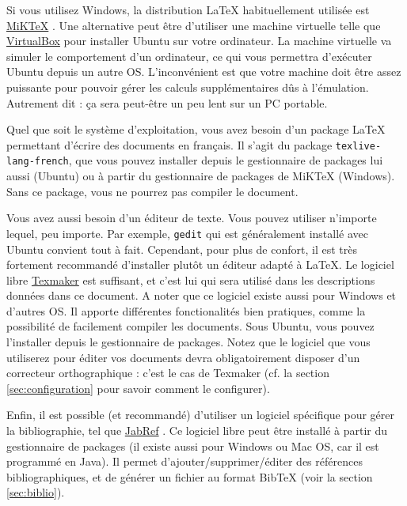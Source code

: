 \documentclass{ceri}
\begin{document}
Si vous utilisez Windows, la distribution \LaTeX{} habituellement utilisée est \href{http://miktex.org/}{MiKTeX} \cite{MiKTeX2015}. Une alternative peut être d'utiliser une machine virtuelle telle que \href{http://www.virtualbox.org/}{VirtualBox} \cite{Oracle2011} pour installer Ubuntu sur votre ordinateur. La machine virtuelle va simuler le comportement d'un ordinateur, ce qui vous permettra d'exécuter Ubuntu depuis un autre OS. L'inconvénient est que votre machine doit \^etre assez puissante pour pouvoir gérer les calculs supplémentaires d\^us à l'émulation. Autrement dit : ça sera peut-être un peu lent sur un PC portable. 

Quel que soit le système d'exploitation, vous avez besoin d'un package \LaTeX{} permettant d'écrire des documents en français. Il s'agit du package \texttt{texlive-lang-french}, que vous pouvez installer depuis le gestionnaire de packages lui aussi (Ubuntu) ou à partir du gestionnaire de packages de MiKTeX (Windows). Sans ce package, vous ne pourrez pas compiler le document.

Vous avez aussi besoin d'un éditeur de texte. Vous pouvez utiliser n'importe lequel, peu importe. Par exemple, \texttt{gedit} qui est généralement installé avec Ubuntu convient tout à fait. Cependant, pour plus de confort, il est très fortement recommandé d'installer plutôt un éditeur adapté à \LaTeX{}. Le logiciel libre \href{http://www.xm1math.net/texmaker/}{Texmaker} \cite{Texmaker2011} est suffisant, et c'est lui qui sera utilisé dans les descriptions données dans ce document. A noter que ce logiciel existe aussi pour Windows et d'autres OS. Il apporte différentes fonctionalités bien pratiques, comme la possibilité de facilement compiler les documents. Sous Ubuntu, vous pouvez l'installer depuis le gestionnaire de packages. Notez que le logiciel que vous utiliserez pour éditer vos documents devra obligatoirement disposer d'un correcteur orthographique : c'est le cas de Texmaker (cf\@. la section \ref{sec:configuration} pour savoir comment le configurer).

Enfin, il est possible (et recommandé) d'utiliser un logiciel spécifique pour gérer la bibliographie, tel que \href{http://jabref.sourceforge.net/}{JabRef} \cite{JabRef2008}. Ce logiciel libre peut être installé à partir du gestionnaire de packages (il existe aussi pour Windows ou Mac OS, car il est programmé en Java). Il permet d'ajouter/supprimer/éditer des références bibliographiques, et de générer un fichier au format BibTeX (voir la section \ref{sec:biblio}).
\end{document}
